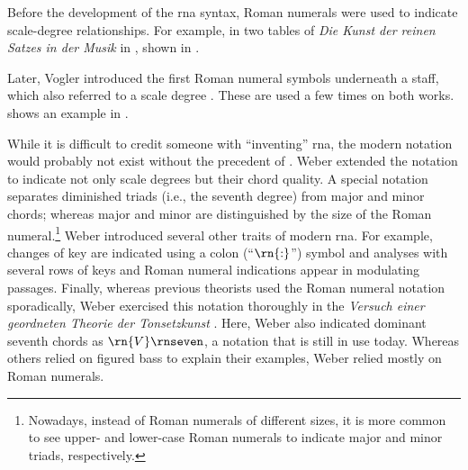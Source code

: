



Before the development of the \gls{rna} syntax, Roman
numerals were used to indicate scale-degree relationships.
For example, in two tables of \emph{Die Kunst der reinen
Satzes in der Musik} in \textcite{kirnberger1774kunst},
shown in .


Later, Vogler introduced the first Roman numeral symbols
underneath a staff, which also referred to a scale degree
\parencite{vogler1778grunde, vogler1802handbuch}. These are
used a few times on both works.
 shows an
example in \textcite{vogler1778grunde}.


While it is difficult to credit someone with ``inventing''
\gls{rna}, the modern notation would probably not exist
without the precedent of \textcite{weber1817versuch}. Weber
extended the notation to indicate not only scale degrees but
their chord quality. A special notation separates diminished
triads (i.e., the seventh degree) from major and minor
chords; whereas major and minor are distinguished by the
size of the Roman numeral.\footnote{Nowadays, instead of
Roman numerals of different sizes, it is more common to see
upper- and lower-case Roman numerals to indicate major and
minor triads, respectively.} Weber introduced several other
traits of modern \gls{rna}. For example, changes of key are
indicated using a colon (``$\rn{:}$'') symbol and analyses
with several rows of keys and Roman numeral indications
appear in modulating passages. Finally, whereas previous
theorists used the Roman numeral notation sporadically,
Weber exercised this notation thoroughly in the
\emph{Versuch einer geordneten Theorie der Tonsetzkunst}
\parencite{weber1817versuch}. Here, Weber also indicated
dominant seventh chords as $\rn{V}\rnseven$, a notation that
is still in use today. Whereas others relied on figured bass
to explain their examples, Weber relied mostly on Roman
numerals.
